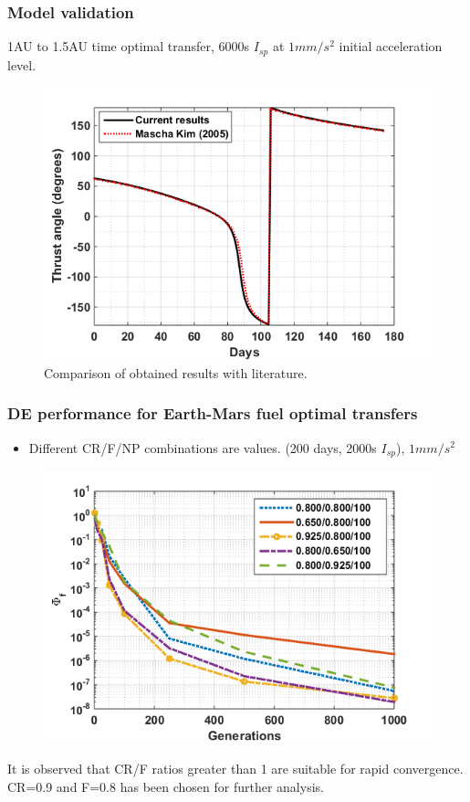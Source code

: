\documentclass{beamer}
\begin{document}
\begin{frame}
\frametitle{Model validation}
1AU to 1.5AU time optimal transfer, 6000s $I_{sp}$ at $1mm/s^2$ initial acceleration level.
\vspace{-2.25mm}
\begin{figure}
	\centering\includegraphics[width=0.65\linewidth]{Imgs/Results_Compare_bold.png}
	\vspace{-1.75mm}
	\caption{Comparison of obtained results with literature.}
\end{figure}	
\end{frame}

\begin{frame}
\frametitle{DE performance for Earth-Mars fuel optimal transfers}
\vspace{-2mm}
\begin{itemize}
	\item Different CR/F/NP combinations are values. (200 days, 2000s $I_{sp}$), $1mm/s^2$
\end{itemize}
\begin{figure}
	\vspace{-3.75mm}
	\centering\includegraphics[width=0.60\linewidth]{Imgs/De_convgc_new.png}
\end{figure}
\vspace{-3.75mm}
It is observed that CR/F ratios greater than 1 are suitable for rapid convergence. CR=0.9 and F=0.8 has been chosen for further analysis.
\end{frame}
\end{document}

